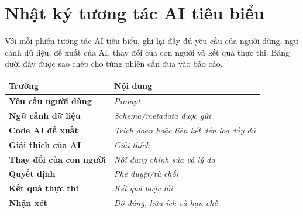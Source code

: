 \chapter{Nhật ký tương tác AI tiêu biểu}
\label{app:ai-logs}

Với mỗi phiên tương tác AI tiêu biểu, ghi lại đầy đủ yêu cầu của người dùng, ngữ cảnh dữ liệu,
đề xuất của AI, thay đổi của con người và kết quả thực thi. Bảng dưới đây được sao chép cho từng
phiên cần đưa vào báo cáo.

\begin{table}[H]
\centering
\renewcommand{\arraystretch}{1.25}
\begin{tabularx}{0.88\textwidth}{>{\bfseries}p{}X}
\toprule
\textbf{Trường} & \textbf{Nội dung} \\
\midrule
Yêu cầu người dùng
    & \textit{Prompt} \\
Ngữ cảnh dữ liệu
    & \textit{Schema/metadata được gửi} \\
Code AI đề xuất
    & \textit{Trích đoạn hoặc liên kết đến log đầy đủ} \\
Giải thích của AI
    & \textit{Giải thích} \\
Thay đổi của con người
    & \textit{Nội dung chỉnh sửa và lý do} \\
Quyết định
    & \textit{Phê duyệt/từ chối} \\
Kết quả thực thi
    & \textit{Kết quả hoặc lỗi} \\
Nhận xét
    & \textit{Độ đúng, hữu ích và hạn chế} \\
\bottomrule
\end{tabularx}
\end{table}
